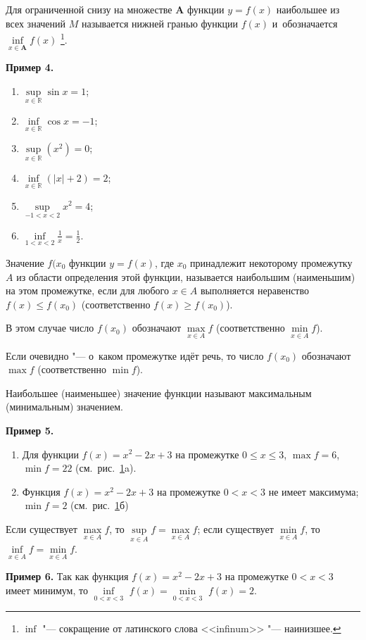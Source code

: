 Для ограниченной снизу на множестве $\mathbf{A}$ функции $y = f(x)$
наибольшее из всех значений $M$ называется нижней гранью функции $f(x)$
и~обозначается $\inf\limits_{x \in \mathbf{A}} f(x)$
\footnote{$\inf$ "--- сокращение от латинского слова <<infinum>>
"--- наинизшее.}.

\textbf{Пример 4.}
\begin{enumerate}
\item $\sup\limits_{x \in \mathbb{R}} \sin x = 1$;
\item $\inf\limits_{x \in \mathbb{R}} \cos x = -1$;
\item $\sup\limits_{x \in \mathbb{R}} (x^{2}) = 0$;
\item $\inf\limits_{x \in \mathbb{R}} (|x| + 2) = 2$;
\item $\sup\limits_{-1<x<2} x^{2} = 4$;
\item $\displaystyle \inf\limits_{1<x<2} \frac{1}{x} = \frac{1}{2}$.
\end{enumerate}

\begin{Def}
Значение $f(x_{0}$ функции $y = f(x)$, где $x_{0}$ принадлежит
некоторому промежутку $A$ из области определения этой функции,
называется наибольшим (наименьшим) на этом промежутке,
если для любого $x \in A$ выполняется неравенство $f(x) \leqslant f(x_{0})$
(соответственно $f(x) \geqslant f(x_{0})$).

В этом случае число $f(x_{0})$ обозначают $\max\limits_{x \in A} f$
(соответственно $\min\limits_{x \in A} f$).
\end{Def}

Если очевидно "--- о~каком промежутке идёт речь, то число $f(x_{0})$
обозначают $\max f$ (соответственно $\min f$).

Наибольшее (наименьшее) значение функции называют максимальным
(минимальным) значением.

\textbf{Пример 5.}
\begin{enumerate}
\item Для функции $f(x) = x^{2} - 2x + 3$ на промежутке
$0 \leqslant x \leqslant 3$,
\linebreak ${\max f = 6}$, $\min f = 22$
(см.\ рис.\ \ref{fig_1_5_3}a).

\item Функция $f(x) = x^{2} - 2x + 3$ на промежутке
$0 < x <3$ не имеет максимума; $\min f = 2$ (см.\ рис.\ \ref{fig_1_5_3}б)
\end{enumerate}

\begin{figure}\label{fig_1_5_3}
\end{figure}

Если существует $\max\limits_{x \in A} f$,
то $\sup\limits_{x \in A} f = \max\limits_{x \in A} f$;
если существует $\min\limits_{x \in A} f$,
то $\inf\limits_{x \in A} f = \min\limits_{x \in A} f$.

\textbf{Пример 6.}
Так как функция $f(x) = x^{2} - 2x + 3$ на промежутке 
\linebreak ${0 < x < 3}$
имеет минимум, то
$\inf\limits_{0<x<3}$ $f(x) = \min\limits_{0<x<3}$ $f(x) = 2$.

